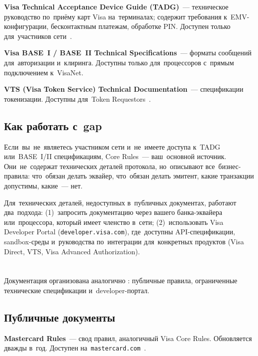 \textbf{Visa Technical Acceptance Device Guide (TADG)}~---
техническое руководство по~приёму карт Visa на~терминалах;
содержит требования к~EMV-конфигурации, бесконтактным
платежам, обработке PIN. Доступен только для~участников
сети~.

\textbf{Visa BASE~I / BASE~II Technical Specifications}~---
форматы сообщений для~авторизации и~клиринга. Доступны
только для~процессоров с~прямым подключением к~VisaNet.

\textbf{VTS (Visa Token Service) Technical Documentation}~---
спецификации токенизации. Доступны для~Token
Requestors~.

\subsection*{Как работать с~gap}

Если~вы~не~являетесь участником сети 
и~не~имеете доступа к~TADG или~BASE~I/II спецификациям,
Core Rules~--- ваш~основной источник. Они~не~содержат
технических деталей протокола, но~описывают все~бизнес-правила:
что~обязан делать эквайер, что~обязан делать эмитент,
какие транзакции допустимы, какие~--- нет.

Для~технических деталей, недоступных в~публичных документах,
работают два~подхода: (1)~запросить документацию через
вашего банка-эквайера или~процессора, который имеет
членство в~сети; (2)~использовать Visa Developer Portal
(\texttt{developer.visa.com}), где~доступны API-спецификации,
sandbox-среды и~руководства по~интеграции для~конкретных
продуктов (Visa Direct, VTS, Visa Advanced Authorization).


\section{}
\label{sec:ps-mastercard}

Документация  организована аналогично
: публичные правила, ограниченные технические
спецификации и~developer-портал.

\subsection*{Публичные документы}

\textbf{Mastercard Rules}~--- свод правил, аналогичный
Visa Core Rules. Обновляется дважды в~год. Доступен
на~\texttt{mastercard.com}~.

